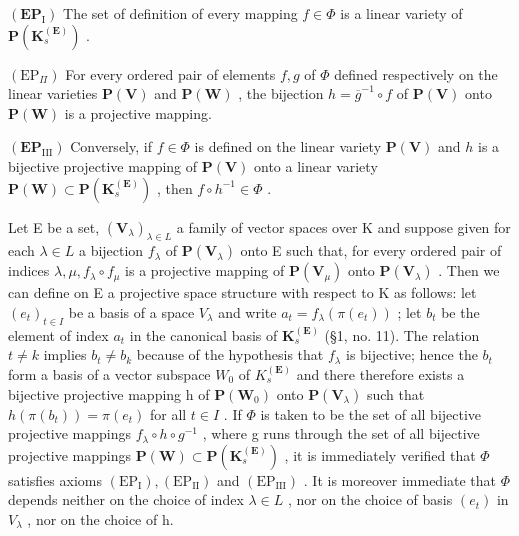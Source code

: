 \((\mathbf{EP}_{\mathrm{I}})\) The set of definition of every mapping \(f \in \Phi\) is a linear variety of \(\mathbf{P}(\mathbf{K}_s^{(\mathbf{E})})\) .

\((\mathrm{EP}_{\Pi})\) For every ordered pair of elements \(f, g\) of \(\Phi\) defined respectively on the linear varieties \(\mathbf{P}(\mathbf{V})\) and \(\mathbf{P}(\mathbf{W})\) , the bijection \(h = \overline{g}^{-1} \circ f\) of \(\mathbf{P}(\mathbf{V})\) onto \(\mathbf{P}(\mathbf{W})\) is a projective mapping.

\((\mathbf{EP}_{\mathrm{III}})\) Conversely, if \(f \in \Phi\) is defined on the linear variety \(\mathbf{P}(\mathbf{V})\) and \(h\) is a bijective projective mapping of \(\mathbf{P}(\mathbf{V})\) onto a linear variety \(\mathbf{P}(\mathbf{W}) \subset \mathbf{P}(\mathbf{K}_s^{\mathbf{(E)}})\) , then \(f \circ h^{-1} \in \Phi\) .

Let E be a set, \((\mathbf{V}_{\lambda})_{\lambda \in L}\) a family of vector spaces over K and suppose given for each \(\lambda \in L\) a bijection \(f_{\lambda}\) of \(\mathbf{P}(\mathbf{V}_{\lambda})\) onto E such that, for every ordered pair of indices \(\lambda, \mu, f_{\lambda} \circ f_{\mu}\) is a projective mapping of \(\mathbf{P}(\mathbf{V}_{\mu})\) onto \(\mathbf{P}(\mathbf{V}_{\lambda})\) . Then we can define on E a projective space structure with respect to K as follows: let \((e_{t})_{t \in I}\) be a basis of a space \(V_{\lambda}\) and write \(a_{t} = f_{\lambda}(\pi(e_{t}))\) ; let \(b_{t}\) be the element of index \(a_{t}\) in the canonical basis of \(\mathbf{K}_{s}^{(\mathbf{E})}\) (§1, no. 11). The relation \(t \neq k\) implies \(b_{t} \neq b_{k}\) because of the hypothesis that \(f_{\lambda}\) is bijective; hence the \(b_{t}\) form a basis of a vector subspace \(W_{0}\) of \(K_{s}^{(\mathbf{E})}\) and there therefore exists a bijective projective mapping h of \(\mathbf{P}(\mathbf{W}_{0})\) onto \(\mathbf{P}(\mathbf{V}_{\lambda})\) such that \(h(\pi(b_{t})) = \pi(e_{t})\) for all \(t \in I\) . If \(\Phi\) is taken to be the set of all bijective projective mappings \(f_{\lambda} \circ h \circ g^{-1}\) , where g runs through the set of all bijective projective mappings \(\mathbf{P}(\mathbf{W}) \subset \mathbf{P}(\mathbf{K}_{s}^{(\mathbf{E})})\) , it is immediately verified that \(\Phi\) satisfies axioms \((\mathrm{EP}_{\mathrm{I}}), (\mathrm{EP}_{\mathrm{II}})\) and \((\mathrm{EP}_{\mathrm{III}})\) . It is moreover immediate that \(\Phi\) depends neither on the choice of index \(\lambda \in L\) , nor on the choice of basis \((e_{t})\) in \(V_{\lambda}\) , nor on the choice of h.

